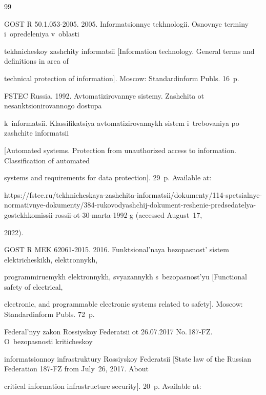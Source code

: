 {\small\frenchspacing


{ %




\begin{thebibliography}{99}




GOST R 50.1.053-2005. 2005. Informatsionnye tekhnologii. Osnovnye terminy i~opre\-de\-le\-niya v~oblasti 


tekhnicheskoy zashchity informatsii [Information technology. General terms and definitions in area of 


technical protection of information]. Moscow: Standardinform Publs. 16~p.




FSTEC Russia. 1992. Avtomatizirovannye sistemy. Zashchita ot nesanktsionirovannogo dostupa 


k~informatsii. Klassifikatsiya avtomatizirovannykh sistem i~trebovaniya po zashchite informatsii 


[Automated systems. Protection from unauthorized access to information. Classification of automated 


systems and requirements for data protection]. 29~p. Available at: 


{\sf https://fstec.ru/tekhnicheskaya-zashchita-informatsii/dokumenty/114-spetsialnye-normativnye-dokumenty/384-rukovodyashchij-dokument-reshenie-predsedatelya-gostekhkomissii-rossii-ot-30-marta-1992-g} (accessed August~17, 


2022).




GOST R MEK 62061-2015. 2016. Funktsional'naya bezopasnost' sistem elekt\-ri\-che\-skikh, elektronnykh, 


programmiruemykh elektronnykh, svyazannykh s~bezopas\-nost'yu [Functional safety of electrical, 


electronic, and programmable electronic systems related to safety]. Moscow: Standardinform Publs. 72~p.




Federal'nyy zakon Rossiyskoy Federatsii ot 26.07.2017 No.\,187-FZ. O~bezopas\-nosti kriticheskoy 


informatsionnoy infrastruktury Rossiyskoy Federatsii [State law of the Russian Federation 187-FZ from July~26, 2017. About 


critical information infrastructure security]. 20~p. Available at: {\sf  


}
\end{thebibliography}}}
